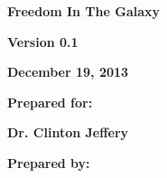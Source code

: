 \documentclass[twoside,letterpaper]{article}
\begin{document}
\bigskip

{\centering{}\bfseries\color{black}
Freedom In The Galaxy
\par}


\bigskip


\bigskip


\bigskip

{\centering \par}


\bigskip


\bigskip


\bigskip


\bigskip

{\centering{}\bfseries\color{black}
Version 0.1
\par}

{\centering{}\bfseries\color{black}
December 19, 2013
\par}


\bigskip


\bigskip

{\centering{}\bfseries\color{black}
Prepared for:
\par}

{\centering{}\bfseries\color{black}
Dr. Clinton Jeffery
\par}


\bigskip


\bigskip

{\centering{}\bfseries\color{black}
Prepared by:
\par}
\end{document}
